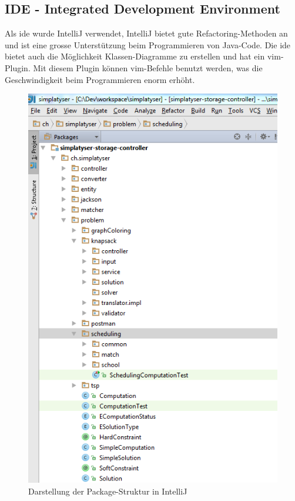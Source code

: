 \subsection{IDE - Integrated Development Environment}
Als \gls{ide} wurde IntelliJ verwendet, IntelliJ bietet gute Refactoring-Methoden an und ist eine grosse Unterstützung beim Programmieren von Java-Code. Die \gls{ide} 
bietet auch die Möglichkeit Klassen-Diagramme zu erstellen und hat ein \gls{vim}-Plugin. Mit diesem Plugin können \gls{vim}-Befehle benutzt werden, was die 
Geschwindigkeit beim Programmieren enorm erhöht.

\begin{figure}[h]
\centering
\includegraphics[scale=0.7]{images/IntelliJ.png}
\caption[Darstellung der Package-Struktur in IntelliJ]{Darstellung der Package-Struktur in IntelliJ \selfmade{}}
\label{fig:IntelliJ}
\end{figure}

